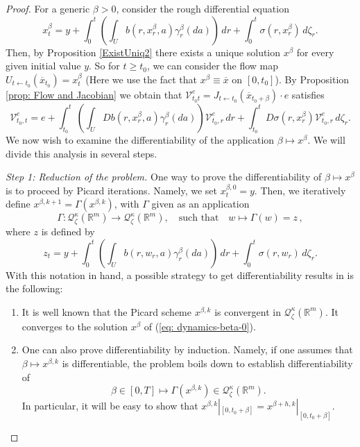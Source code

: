 \documentclass[12pt,reqno]{amsart}
\numberwithin{equation}{section}  %
\newcommand{\1}{{\bf 1}}
\newcommand{\2}{{\bf 2}}
\newcommand{\R}{\mathbb R}
\newcommand{\ga}{\gamma}
\newcommand{\ka}{\kappa}
\newcommand{\lp}{\left(}
\newcommand{\rp}{\right)}
\theoremstyle{remark}
\theoremstyle{remark}
\begin{document}
\begin{proof}
For a generic $\beta>0$, consider the rough differential equation
\begin{equation} \label{eq: dynamics-beta-0}
    x_{t}^{\beta}=y+\int_{0}^{t}\lp \int_{U}b(r,x_{r}^{\beta},a)\ga_{r}^{\beta}(da)\rp\,dr+\int_{0}^{t}\sigma(r,x_{r}^{\beta})\,d \zeta_{r}.
\end{equation}
Then, by Proposition \ref{ExistUniq2} there exists a unique solution $x^{\beta}$ for every given initial value $y$. So for $t\geq t_{0}$, we can consider the flow map $U_{t\leftarrow t_{0}}(\overline{x}_{t_{0}})=x_{t}^{\beta}$ (Here we use the fact that $x^{\beta}\equiv \overline{x}$ on $[0,t_{0}]$). By Proposition \ref{prop: Flow and Jacobian} we obtain that $\mathcal{V}^{e}_{t_{0}t}=J_{t\leftarrow t_{0}}(\overline{x}_{t_{0}+\beta})\cdot e$ satisfies
\[\mathcal{V}_{t_{0},t}^{e}=e+\int_{t_{0}}^{t}\lp \int_{U}Db(r,x_{r}^{\beta},a)\gamma_{r}^{\beta}(da) \rp \mathcal{V}_{t_{0},r}^{e}\,dr +\int_{t_{0}}^{t}D\sigma(r,x_{r}^{\beta})\mathcal{V}_{t_{0},r}^{e}\,d\zeta_{r}.\]
We now wish to examine the differentiability of the application $\beta\mapsto x^{\beta}$. We will divide this analysis in several steps.

\smallskip
\noindent
\textit{Step 1: Reduction of the problem.}
One way to prove the differentiability of $\beta\mapsto x^{\beta}$ is to proceed by Picard iterations. Namely, we set $x_{t}^{\beta,0}=y$. Then, we iteratively define $x^{\beta,k+1}=\Gamma(x^{\beta,k})$, with $\Gamma$ given as an application
\begin{equation*}
  \Gamma\colon \mathcal{Q}_{\zeta}^{\ka}(\R^{m})  \longrightarrow \mathcal{Q}_{\zeta}^{\ka}(\R^m) ,
\quad\text{such that}\quad
  w  \longmapsto \Gamma(w) = z \, ,
\end{equation*}
 where $z$ is defined by
 \[z_{t}=y+\int_{0}^{t}\lp \int_{U}b(r,w_{r},a)\ga_{r}^{\beta}(da)\rp\,dr+\int_{0}^{t}\sigma(r,w_{r})\,d \zeta_{r}.\]
 With this notation in hand, a possible strategy to get differentiability results in \cite[Chapter 11]{friz-victoir}  is the following:
   \begin{enumerate}[wide, labelwidth=!, labelindent=0pt, label=\textnormal{(\arabic*)}]
   \setlength\itemsep{.05in}
       \item It is well known that the Picard scheme $x^{\beta,k}$ is convergent in $\mathcal{Q}_{\zeta}^{\kappa}(\R^m)$. It converges to the solution $x^{\beta}$ of (\ref{eq: dynamics-beta-0}).
       
       \item One can also prove differentiability by induction. Namely, if one assumes that $\beta \mapsto x^{\beta,k}$ is differentiable, the problem boils down to establish differentiability of
       \begin{equation}\label{c1}
 \beta\in [0,T]  \longmapsto \Gamma(x^{\beta,k})\in\mathcal{Q}_{\zeta}^{\ka}(\R^m).
\end{equation}
In particular, it will be easy to show that $x^{\beta,k}|_{[0,t_{0}+\beta]}=x^{\beta+h,k}|_{[0,t_{0}+\beta]}$.


\end{enumerate}
\end{proof}
\end{document}
